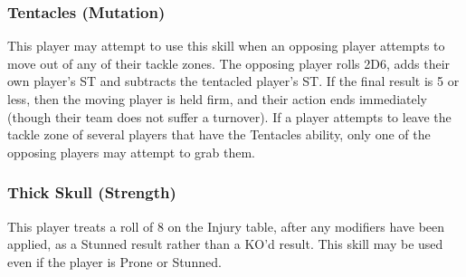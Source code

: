 \begin{multicols}{3}
\subsubsection{Tentacles (Mutation)}
\par This player may attempt to use this skill when an opposing player attempts to move out of any of their tackle zones. The opposing player rolls 2D6, adds their own player's ST and subtracts the tentacled player's ST. If the final result is 5 or less, then the moving player is held firm, and their action ends immediately (though their team does not suffer a turnover). If a player attempts to leave the tackle zone of several players that have the Tentacles ability, only one of the opposing players may attempt to grab them.

\subsubsection{Thick Skull (Strength)}
\par This player treats a roll of 8 on the Injury table, after any modifiers have been applied, as a Stunned result rather than a KO'd result. This skill may be used even if the player is Prone or Stunned.


\end{multicols}
